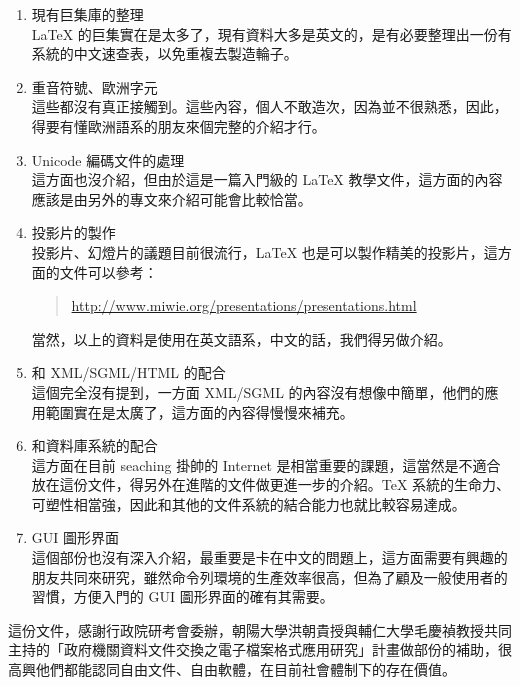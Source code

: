 \begin{enumerate}
  \item 現有巨集庫的整理 \\
  \LaTeX{} 的巨集實在是太多了，現有資料大多是英文的，是有必要整理出一份有系統的中文速查表，以免重複去製造輪子。

  \item 重音符號、歐洲字元 \\
  這些都沒有真正接觸到。這些內容，個人不敢造次，因為並不很熟悉，因此，得要有懂歐洲語系的朋友來個完整的介紹才行。

  \item Unicode 編碼文件的處理 \\
  這方面也沒介紹，但由於這是一篇入門級的 \LaTeX{} 教學文件，這方面的內容應該是由另外的專文來介紹可能會比較恰當。

  \item 投影片的製作 \\
  投影片、幻燈片的議題目前很流行，\LaTeX{} 也是可以製作精美的投影片，這方面的文件可以參考：

  \begin{quote}
    \url{http://www.miwie.org/presentations/presentations.html}
  \end{quote}

  當然，以上的資料是使用在英文語系，中文的話，我們得另做介紹。

  \item 和 XML/SGML/HTML 的配合 \\
  這個完全沒有提到，一方面 XML/SGML 的內容沒有想像中簡單，他們的應用範圍實在是太廣了，這方面的內容得慢慢來補充。

  \item 和資料庫系統的配合 \\
  這方面在目前 seaching 掛帥的 Internet 是相當重要的課題，這當然是不適合放在這份文件，得另外在進階的文件做更進一步的介紹。\TeX{} 系統的生命力、可塑性相當強，因此和其他的文件系統的結合能力也就比較容易達成。

  \item GUI 圖形界面 \\
  這個部份也沒有深入介紹，最重要是卡在中文的問題上，這方面需要有興趣的朋友共同來研究，雖然命令列環境的生產效率很高，但為了顧及一般使用者的習慣，方便入門的 GUI 圖形界面的確有其需要。

\end{enumerate}

這份文件，感謝行政院研考會委辦，朝陽大學洪朝貴授與輔仁大學毛慶禎教授共同主持的「政府機關資料文件交換之電子檔案格式應用研究」計畫做部份的補助，很高興他們都能認同自由文件、自由軟體，在目前社會體制下的存在價值。


